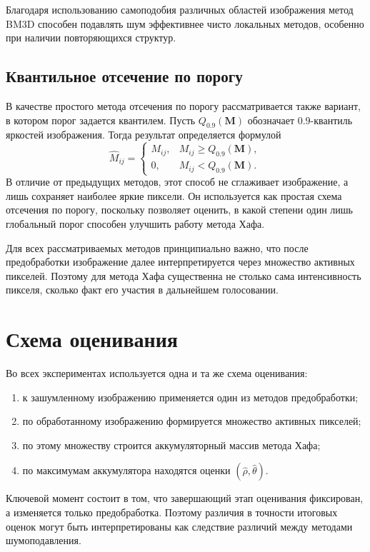 Благодаря использованию самоподобия различных областей изображения метод BM3D способен подавлять шум эффективнее чисто локальных методов, особенно при наличии повторяющихся структур.

\subsection*{Квантильное отсечение по порогу}

В качестве простого метода отсечения по порогу рассматривается также вариант, в котором порог задается квантилем. Пусть $Q_{0.9}(\mathbf{M})$ обозначает $0.9$-квантиль яркостей изображения. Тогда результат определяется формулой
\[
\widehat{M}_{ij} =
\begin{cases}
M_{ij}, & M_{ij} \ge Q_{0.9}(\mathbf{M}), \\
0, & M_{ij} < Q_{0.9}(\mathbf{M}).
\end{cases}
\]
В отличие от предыдущих методов, этот способ не сглаживает изображение, а лишь сохраняет наиболее яркие пиксели. Он используется как простая схема отсечения по порогу, поскольку позволяет оценить, в какой степени один лишь глобальный порог способен улучшить работу метода Хафа.

Для всех рассматриваемых методов принципиально важно, что после предобработки изображение далее интерпретируется через множество активных пикселей. Поэтому для метода Хафа существенна не столько сама интенсивность пикселя, сколько факт его участия в дальнейшем голосовании.

\section{Схема оценивания}

Во всех экспериментах используется одна и та же схема оценивания:
\begin{enumerate}
	\item к зашумленному изображению применяется один из методов предобработки;
	\item по обработанному изображению формируется множество активных пикселей;
	\item по этому множеству строится аккумуляторный массив метода Хафа;
	\item по максимумам аккумулятора находятся оценки $(\hat{\rho},\hat{\theta})$.
\end{enumerate}

Ключевой момент состоит в том, что завершающий этап оценивания фиксирован, а изменяется только предобработка. Поэтому различия в точности итоговых оценок могут быть интерпретированы как следствие различий между методами шумоподавления.
